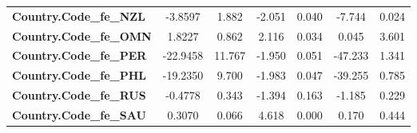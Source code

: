 \begin{center}
\begin{tabular}{lcccccc}
\textbf{Country.Code\_fe\_NZL}                            &      -3.8597  &        1.882     &    -2.051  &         0.040        &       -7.744    &        0.024     \\
\textbf{Country.Code\_fe\_OMN}                            &       1.8227  &        0.862     &     2.116  &         0.034        &        0.045    &        3.601     \\
\textbf{Country.Code\_fe\_PER}                            &     -22.9458  &       11.767     &    -1.950  &         0.051        &      -47.233    &        1.341     \\
\textbf{Country.Code\_fe\_PHL}                            &     -19.2350  &        9.700     &    -1.983  &         0.047        &      -39.255    &        0.785     \\
\textbf{Country.Code\_fe\_RUS}                            &      -0.4778  &        0.343     &    -1.394  &         0.163        &       -1.185    &        0.229     \\
\textbf{Country.Code\_fe\_SAU}                            &       0.3070  &        0.066     &     4.618  &         0.000        &        0.170    &        0.444     \\
\bottomrule
\end{tabular}
\end{center}